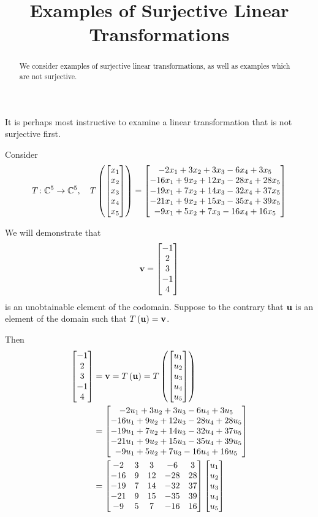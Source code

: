 \documentclass{ximera}
\title{Examples of Surjective Linear Transformations}
\begin{document}
\begin{abstract}
  We consider examples of surjective linear transformations, as well as examples which are not surjective.
\end{abstract}
\maketitle

It is perhaps most instructive to examine a linear transformation that is not surjective first.

\begin{example}
Consider
\[T\colon \mathbb{C}^{5}\rightarrow\mathbb{C}^{5},\quad
T\left(\begin{bmatrix}x_1\\x_2\\x_3\\x_4\\x_5\end{bmatrix}\right)=
\begin{bmatrix}-2 x_1 + 3 x_2 + 3 x_3 - 6 x_4 + 3 x_5\\
-16 x_1 + 9 x_2 + 12 x_3 - 28 x_4 + 28 x_5\\
-19 x_1 + 7 x_2 + 14 x_3 - 32 x_4 + 37 x_5\\
-21 x_1 + 9 x_2 + 15 x_3 - 35 x_4 + 39 x_5\\
-9 x_1 + 5 x_2 + 7 x_3 - 16 x_4 + 16 x_5\end{bmatrix}
\]

We will demonstrate that
\[
\mathbf{v}=\begin{bmatrix}-1\\2\\3\\-1\\4\end{bmatrix}
\]
is an unobtainable element of the codomain.  Suppose to the contrary that $\mathbf{u}$ is an element of the domain such that $T\left(\mathbf{u}\right)=\mathbf{v}$.

Then
\begin{align*}
\begin{bmatrix}-1\\2\\3\\-1\\4\end{bmatrix}&=\mathbf{v}=T\left(\mathbf{u}\right)
=T\left(\begin{bmatrix}u_1\\u_2\\u_3\\u_4\\u_5\end{bmatrix}\right)\\
&=\begin{bmatrix}
-2 u_1 + 3 u_2 + 3 u_3 - 6 u_4 + 3 u_5\\
-16 u_1 + 9 u_2 + 12 u_3 - 28 u_4 + 28 u_5\\
-19 u_1 + 7 u_2 + 14 u_3 - 32 u_4 + 37 u_5\\
-21 u_1 + 9 u_2 + 15 u_3 - 35 u_4 + 39 u_5\\
-9 u_1 + 5 u_2 + 7 u_3 - 16 u_4 + 16 u_5\end{bmatrix}\\
&=
\begin{bmatrix}
-2&3&3&-6&3\\
-16&9&12&-28&28\\
-19&7&14&-32&37\\
-21&9&15&-35&39\\
-9&5&7&-16&16
\end{bmatrix}
\begin{bmatrix}u_1\\u_2\\u_3\\u_4\\u_5\end{bmatrix}
\end{align*}


\end{example}
\end{document}
